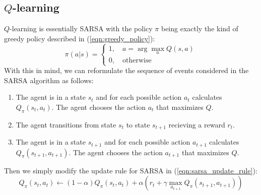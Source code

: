 \documentclass[journal, onecolumn, 12pt, draftclsnofoot]{IEEEtran}
\numberwithin{equation}{section}
\begin{document}
		\subsection{$Q$-learning}
		\par $Q$-learning is essentially SARSA with the policy $\pi$ being exactly the kind of greedy policy described in (\ref{eqn:greedy_policy}):
		\begin{equation}
			\label{eqn:q_greedy_policy}
			\pi(a \vert s) = \begin{cases}
				1, \quad a = \arg \max_a Q(s, a) \\
				0, \quad \text{otherwise}
		\end{cases}
		\end{equation}
		With this in mind, we can reformulate the sequence of events considered in the SARSA algorithm as follows:
		\begin{enumerate}
			\item The agent is in a state $s_t$ and for each possible action $a_t$ calculates $Q_\pi(s_t, a_t)$. The agent chooses the action $a_t$ that maximizes $Q$.
			\item The agent transitions from state $s_t$ to state $s_{t+1}$ recieving a reward $r_t$.
			\item The agent is in a state $s_{t+1}$ and for each possible action $a_{t+1}$ calculates $Q_\pi(s_{t+1}, a_{t+1})$. The agent chooses the action $a_{t+1}$ that maximizes $Q$.
		\end{enumerate}
		Then we simply modify the update rule for SARSA in (\ref{eqn:sarsa_update_rule}):
		\begin{equation}
			\label{eqn:q_update_rule}
			Q_\pi(s_t, a_t) \gets (1 - \alpha) Q_\pi(s_t, a_t) + \alpha (
			r_t + \gamma \max_{a_{t+1}} Q_\pi(s_{t+1}, a_{t+1}))
		\end{equation}
\end{document}
